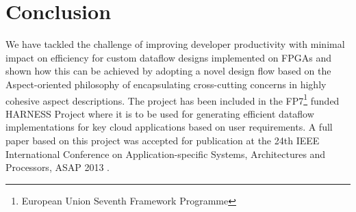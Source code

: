 \section{Conclusion}
\label{sec:conclusion}

We have tackled the challenge of improving developer productivity with
minimal impact on efficiency for custom dataflow designs implemented
on FPGAs and shown how this can be achieved by adopting a novel design
flow based on the Aspect-oriented philosophy of encapsulating
cross-cutting concerns in highly cohesive aspect descriptions. The
project has been included in the FP7\footnote{European Union Seventh
  Framework Programme} funded HARNESS Project where it is to be used
for generating efficient dataflow implementations for key cloud
applications based on user requirements. A full paper based on this
project was accepted for publication at the 24th IEEE International
Conference on Application-specific Systems, Architectures and
Processors, ASAP 2013 \cite{pgrig}.

